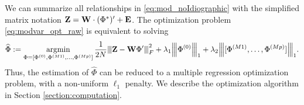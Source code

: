 We can summarize all relationships in \eqref{eq:mod_noIdiographic} with the simplified matrix notation $\Zb = \Wb \cdot(\Phi^*)' + \Eb $. The optimization problem  \eqref{eq:modvar_opt_raw} is equivalent to solving
\begin{equation}\label{eq:modvar_opt_mat}
    \bhat\Phi  := \argmin_{\Phi = [\Phi^{(0)}, \Phi^{(M1)},\ldots , \Phi^{(Mp)}] } \frac{1}{2N}\vertiii{ \Zb - \Wb \Phi' }_F^2 + \lambda_1 \vertiii{\Phi^{(0)}}_1 + \lambda_2 \vertiii{[\Phi^{(M1)},\ldots , \Phi^{(Mp)}]}_1 .
\end{equation}
Thus, the estimation of $\hat\Phi$ can be reduced to a multiple regression optimization problem, with a non-uniform $\ell_1$ penalty. We describe the optimization algorithm in Section \ref{section:computation}.



